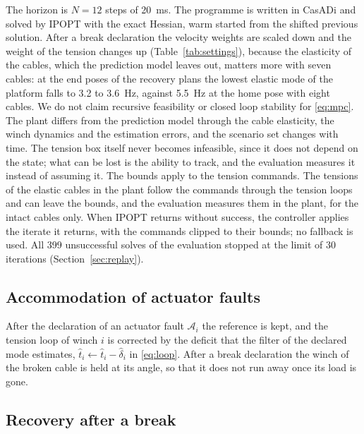 \documentclass[a4paper,fleqn]{cas-dc}
\begin{document}
The horizon is $N=12$ steps of 20~ms. The programme is written in CasADi \citep{andersson2019casadi} and solved by IPOPT \citep{wachter2006ipopt} with the exact Hessian, warm started from the shifted previous solution. After a break declaration the velocity weights are scaled down and the weight of the tension changes up (Table~\ref{tab:settings}), because the elasticity of the cables, which the prediction model leaves out, matters more with seven cables: at the end poses of the recovery plans the lowest elastic mode of the platform falls to 3.2 to 3.6~Hz, against 5.5~Hz at the home pose with eight cables. We do not claim recursive feasibility or closed loop stability for \eqref{eq:mpc}. The plant differs from the prediction model through the cable elasticity, the winch dynamics and the estimation errors, and the scenario set changes with time. The tension box itself never becomes infeasible, since it does not depend on the state; what can be lost is the ability to track, and the evaluation measures it instead of assuming it. The bounds apply to the tension commands. The tensions of the elastic cables in the plant follow the commands through the tension loops and can leave the bounds, and the evaluation measures them in the plant, for the intact cables only. When IPOPT returns without success, the controller applies the iterate it returns, with the commands clipped to their bounds; no fallback is used. All 399 unsuccessful solves of the evaluation stopped at the limit of 30 iterations (Section~\ref{sec:replay}).

\subsection{Accommodation of actuator faults}\label{sec:accommodation}

After the declaration of an actuator fault $\mathcal A_i$ the reference is kept, and the tension loop of winch $i$ is corrected by the deficit that the filter of the declared mode estimates, $\hat t_i\leftarrow\hat t_i-\hat\delta_i$ in \eqref{eq:loop}. After a break declaration the winch of the broken cable is held at its angle, so that it does not run away once its load is gone.

\subsection{Recovery after a break}\label{sec:planner}
\end{document}
